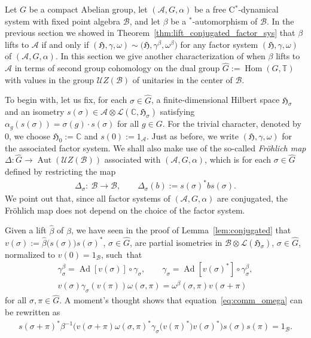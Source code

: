 \documentclass[pdftex]{sigma}
\numberwithin{equation}{section}
\newcommand*{\C}{\mathbb C}		%
\newcommand*{\tensor}{\otimes}		%
\DeclareMathOperator{\Ad}{Ad}		%
\DeclareMathOperator{\Aut}{Aut}
\DeclareMathOperator{\Hom}{Hom}
\newcommand*{\Star}{$^*$\nobreakdash}
\newcommand*{\hilb}{\mathfrak}		%
\newcommand*{\alg}{\mathcal}		%
\newcommand*{\hH}{\hilb{H}}			%
\newcommand*{\one}{1}				%
\newcommand*{\aA}{\alg{A}}			%
\newcommand*{\aB}{\alg{B}} 			%
\newcommand*{\End}{\mathcal{L}} %
\begin{document}
Let $G$ be a compact Abelian group, let $(\aA, G, \alpha)$ be a free C\Star-dynamical system with fixed point algebra $\aB$, and let $\beta$ be a \Star-automorphism of $\aB$.
In the previous section we showed in Theorem~\ref{thm:lift_conjugated_factor_sys} that $\beta$ lifts to $\aA$ if and only if $(\hH,\gamma, \omega) \sim \big(\hH, \gamma^\beta, \omega^\beta\big)$ for any factor system $(\hH, \gamma, \omega)$ of $(\aA, G, \alpha)$.
In this section we give another characterization of when $\beta$ lifts to $\aA$ in terms of second group cohomology on the dual group $\hat G := \Hom(G,\mathbb{T})$ with values in the group $\mathcal{U}Z(\aB)$ of unitaries in the center of $\aB$.

To begin with, let us fix, for each $\sigma \in \hat G$, a finite-dimensional Hilbert space $\hH_\sigma$ and an isometry $s(\sigma)\in \aA \tensor \End(\C,\hH_\sigma)$ satisfying $\alpha_g(s(\sigma)) = \sigma(g) \cdot s(\sigma)$ for all $g \in G$.
For the trivial character, denoted by $0$, we choose $\hH_0 := \C$ and $s(0) := \one_\aA$.
Just as before, we write $(\hH, \gamma, \omega)$ for the associated factor system.
We shall also make use of the so-called \emph{Fr\"ohlich map} \mbox{$\Delta\colon \hat G \to \Aut ( \mathcal{U}Z(\aB) )$} associated with $(\aA, G, \alpha)$, which is for each $\sigma \in \hat G$ defined by restricting the map
\begin{gather*}
	\Delta_\sigma\colon \ \aB \to \aB,
	\qquad \Delta_\sigma(b) := s(\sigma)^* b s(\sigma).
\end{gather*}
We point out that, since all factor systems of $(\aA, G, \alpha)$ are conjugated, the Fr\"ohlich map does not depend on the choice of the factor system.

Given a lift $\hat \beta$ of $\beta$, we have seen in the proof of Lemma~\ref{lem:conjugated} that $v(\sigma) := \hat \beta\big( s(\sigma) \big) s(\sigma)^*$, $\sigma \in \hat G$, are partial isometries in $\aB \tensor \End(\hH_\sigma)$, $\sigma \in \hat G$, normalized to $v(0)=\one_\aB$, such~that
\begin{gather}	\label{eq:comm_gamma}
	\gamma^\beta_\sigma = \Ad[v(\sigma)] \circ \gamma_\sigma,
	\qquad
	\gamma_\sigma = \Ad[v(\sigma)^*] \circ \gamma_\sigma^\beta,
	\\
	v(\sigma) \gamma_\sigma( v(\pi)) \omega(\sigma, \pi)
	= \omega^\beta(\sigma, \pi) v(\sigma + \pi)
	\label{eq:comm_omega}
\end{gather}
for all $\sigma, \pi \in \hat G$.
A moment's thought shows that equation~\eqref{eq:comm_omega} can be rewritten as
\begin{gather*}
	s(\sigma + \pi)^* \beta^{-1}\big( v(\sigma + \pi) \omega(\sigma,\pi)^* \gamma_\sigma\big(v(\pi)^*\big) v(\sigma)^*\big) s(\sigma) s(\pi) = \one_\aB.
\end{gather*}
\end{document}
